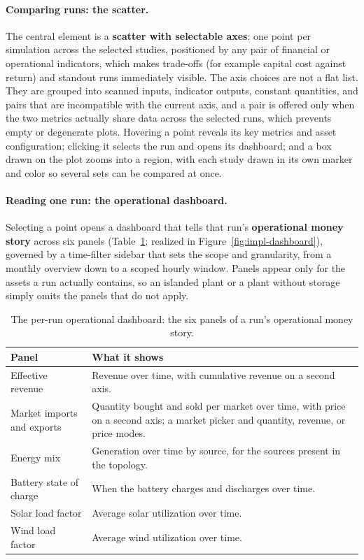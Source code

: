 \paragraph{Comparing runs: the scatter.} The central element is a \textbf{scatter
with selectable axes}: one point per simulation
across the selected studies,
positioned by any pair of financial or operational indicators, which makes
trade-offs (for example capital cost against return) and standout runs immediately
visible. The axis choices are not a flat list. They are grouped into scanned
inputs, indicator outputs, constant quantities, and pairs that are incompatible
with the current axis, and a pair is offered only when the two metrics actually
share data across the selected runs, which prevents empty or degenerate plots.
Hovering a point reveals its key metrics and asset configuration; clicking it
selects the run and opens its dashboard; and a box drawn on the plot zooms into a
region, with each study drawn in its own marker and color so several sets can be
compared at once.

\paragraph{Reading one run: the operational dashboard.} Selecting a point opens a
dashboard that tells that run's \textbf{operational money story} across six panels
(Table~\ref{tab:viz-panels}; realized in
Figure~\ref{fig:impl-dashboard}), governed by a time-filter sidebar that sets the scope
and granularity, from a monthly overview down to a scoped hourly window. Panels
appear only for the assets a run actually contains, so an islanded plant or a plant
without storage simply omits the panels that do not apply.


\begin{table}[H]
  \centering
  \small
  \begin{tabularx}{\linewidth}{@{}>{\raggedright\arraybackslash}p{4.2cm} >{\raggedright\arraybackslash}X@{}}
    \toprule
    \textbf{Panel} & \textbf{What it shows} \\
    \midrule
    Effective revenue & Revenue over time, with cumulative revenue on a second
      axis. \\
    Market imports and exports & Quantity bought and sold per market over time, with
      price on a second axis; a market picker and quantity, revenue, or price
      modes. \\
    Energy mix & Generation over time by source, for the sources present in the
      topology. \\
    Battery state of charge & When the battery charges and discharges over time. \\
    Solar load factor & Average solar utilization over time. \\
    Wind load factor & Average wind utilization over time. \\
    \bottomrule
  \end{tabularx}
  \caption{The per-run operational dashboard: the six panels of a run's operational money story.}
  \label{tab:viz-panels}
\end{table}

